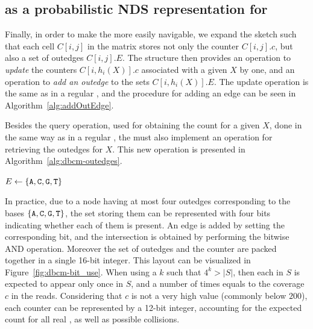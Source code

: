 \subsection{\cm as a probabilistic NDS representation for }
\label{subsubsec:cm-dbg}

Finally, in order to make the \cm more easily navigable, we expand the sketch such that each cell $C[i,j]$ in the matrix stores not only the counter $C[i,j].c$, but also a set of outedges $C[i,j].E$. The structure then provides an operation to \emph{update} the counters $C[i,h_i(X)].c$ associated with a given \kmer $X$ by one, and an operation to \emph{add an outedge} to the sets $C[i,h_i(X)].E$. The update operation is the same as in a regular \cm, and the procedure for adding an edge can be seen in Algorithm~\ref{alg:addOutEdge}.


\begin{algorithm}[htbp]
    \caption{$C.\mathit{add\_outedge}(X, a)$}\label{alg:addOutEdge}
\end{algorithm}

Besides the query operation, used for obtaining the count for a given \kmer $X$, done in the same way as in a regular \cm, the \dBCM must also implement an operation for retrieving the outedges for $X$. This new operation is presented in Algorithm~\ref{alg:dbcm-outedges}.

\begin{algorithm}
	\caption{$C.\mathit{outedges}(X)$}\label{alg:dbcm-outedges}
	$E \gets \{\mathtt{A}, \mathtt{C}, \mathtt{G}, \mathtt{T}\}$\\
\end{algorithm}

In practice, due to a node having at most four outedges corresponding to the bases $\{\mathtt{A}, \mathtt{C}, \mathtt{G}, \mathtt{T}\}$, the set storing them can be represented with four bits indicating whether each of them is present. An edge is added by setting the corresponding bit, and the intersection is obtained by performing the bitwise AND operation. Moreover the set of outedges and the counter are packed together in a single 16-bit integer. This layout can be visualized in Figure~\ref{fig:dbcm-bit_use}. When using a $k$ such that $4^k > |S|$, then each \kmer in $S$ is expected to appear only once in $S$, and a number of times equals to the coverage $c$ in the reads. Considering that $c$ is not a very high value (commonly below $200$), each counter can be represented by a 12-bit integer, accounting for the expected count for all real , as well as possible collisions.

